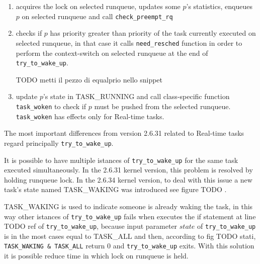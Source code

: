 \begin{enumerate}
\item acquires the lock on selected runqueue, updates some $p$'s statistics, enqueues 
$p$ on selected runqueue and call \texttt{check\_preempt\_rq} 

\lstset{basicstyle=\footnotesize, language=c, captionpos=b, frame=single,label=lis:steps}


\item checks if $p$ has priority greater than priority of the task currently
executed on selected runqueue, in that case it calls \texttt{need\_resched}
function in order to perform the context-switch on selected runqueue at the
end of \texttt{try\_to\_wake\_up}.

TODO metti il pezzo di equalprio nello snippet
\lstset{basicstyle=\footnotesize, language=c, captionpos=b, frame=single,label=lis:steps}


\item update $p$'s state in TASK\_RUNNING and call class-specific function 
\texttt{task\_woken} to check if $p$ must be pushed from the selected runqueue.
\texttt{task\_woken} has effects only for Real-time tasks.

\lstset{basicstyle=\footnotesize, language=c, captionpos=b, frame=single,label=lis:steps}


\end{enumerate}

The most important differences from version 2.6.31 related to Real-time tasks regard principally \texttt{try\_to\_wake\_up}.

It is possible to have multiple istances of \texttt{try\_to\_wake\_up} for the same task executed simultaneously. In the 2.6.31 kernel version, this problem
is resolved by holding runqueue lock. In the 2.6.34 kernel version, to deal with this issue a new task's state named TASK\_WAKING was introduced see 
figure TODO . 

\lstset{basicstyle=\footnotesize, language=c, captionpos=b, frame=single,label=lis:steps}


TASK\_WAKING is used to indicate someone is already waking the task, in this way other istances of \texttt{try\_to\_wake\_up} fails when executes the if 
statement at line TODO ref of \texttt{try\_to\_wake\_up}, because input parameter $state$ of \texttt{try\_to\_wake\_up} is in the most cases equal to 
TASK\_ALL and then, according to fig TODO stati, \texttt{TASK\_WAKING \& TASK\_ALL} return 0 and \texttt{try\_to\_wake\_up} exits. With this solution 
it is possible reduce time in which lock on runqueue is held. 


